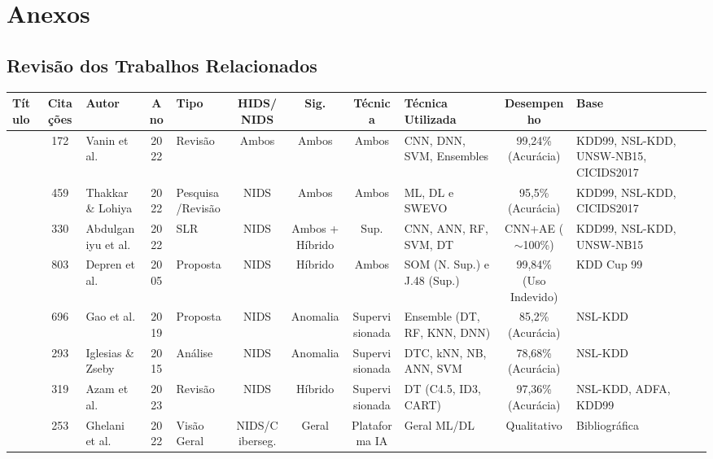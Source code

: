 \section{Anexos}

\subsection{Revisão dos Trabalhos Relacionados}

\begin{table}[htbp]
\centering
\fontsize{10}{12}\selectfont
\renewcommand{\arraystretch}{1.2}
\begin{adjustbox}{width=\textwidth}
\begin{tabular}{p{4cm} c p{3cm} c p{3cm} c c c p{4cm} c p{4cm}}
\toprule
Título & Citações & Autor & Ano & Tipo & HIDS/NIDS & Sig. & Técnica & Técnica Utilizada & Desempenho & Base \\
\midrule
\cite{patrick2022study} & 172 & Vanin et al. & 2022 & Revisão & Ambos & Ambos & Ambos & CNN, DNN, SVM, Ensembles & 99,24\% (Acurácia) & KDD99, NSL-KDD, UNSW-NB15, CICIDS2017 \\
\cite{Thakkar2021Survey} & 459 & Thakkar \& Lohiya & 2022 & Pesquisa/Revisão & NIDS & Ambos & Ambos & ML, DL e SWEVO & 95,5\% (Acurácia) & KDD99, NSL-KDD, CICIDS2017 \\
\cite{Abdulganiyu2023Systematic} & 330 & Abdulganiyu et al. & 2022 & SLR & NIDS & Ambos + Híbrido & Sup. & CNN, ANN, RF, SVM, DT & CNN+AE ($\sim$100\%) & KDD99, NSL-KDD, UNSW-NB15 \\
\cite{Depren2005Intelligent} & 803 & Depren et al. & 2005 & Proposta & NIDS & Híbrido & Ambos & SOM (N. Sup.) e J.48 (Sup.) & 99,84\% (Uso Indevido) & KDD Cup 99 \\
\cite{Xianwei2019Adaptive} & 696 & Gao et al. & 2019 & Proposta & NIDS & Anomalia & Supervisionada & Ensemble (DT, RF, KNN, DNN) & 85,2\% (Acurácia) & NSL-KDD \\
\cite{felix2014analysis} & 293 & Iglesias \& Zseby & 2015 & Análise & NIDS & Anomalia & Supervisionada & DTC, kNN, NB, ANN, SVM & 78,68\% (Acurácia) & NSL-KDD \\
\cite{zehedi2023comparative} & 319 & Azam et al. & 2023 & Revisão & NIDS & Híbrido & Supervisionada & DT (C4.5, ID3, CART) & 97,36\% (Acurácia) & NSL-KDD, ADFA, KDD99 \\
\cite{diptiben2022cyber} & 253 & Ghelani et al. & 2022 & Visão Geral & NIDS/Ciberseg. & Geral & Plataforma IA & Geral ML/DL & Qualitativo & Bibliográfica \\

\end{tabular}
\end{adjustbox}
\end{table}
